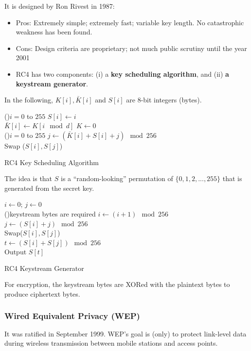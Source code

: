 \documentclass[12pt,titlepage]{article}
\begin{document}
It is designed by Ron Rivest in 1987: \begin{itemize}
\item Pros: Extremely simple; extremely fast; variable key length. No catastrophic weakness has been found.
\item Cons: Design criteria are proprietary; not much public scrutiny until the year 2001
\item RC4 has two components: (i) a \textbf{key scheduling algorithm}, and (ii) \textbf{a keystream generator}.
\end{itemize}

In the following, $K[i], \bar{K}[i]$ and $S[i]$ are 8-bit integers (bytes).

\begin{algorithm}[H]
	\For(){$i = 0$ to $255$}{
		$S[i] \leftarrow i$\\
		$\bar{K}[i] \leftarrow K[i \mod d]$
	}
	$K \leftarrow 0$\\
	\For(){$i = 0$ to $255$}{
		$j \leftarrow (\bar{K}[i] + S[i] + j) \mod 256$\\
		Swap ($S[i], S[j]$)
	}
	\caption{RC4 Key Scheduling Algorithm}
\end{algorithm}
The idea is that $S$ is a ``random-looking'' permutation of $\{0, 1, 2,..., 255\}$ that is generated from the secret key.

\begin{algorithm}[H]
	$i \leftarrow 0$; $j \leftarrow 0$\\
	\While(){keystream bytes are required}{
		$i \leftarrow (i+1) \mod 256$\\
		$j \leftarrow (S[i] + j) \mod 256$\\
		Swap($S[i], S[j]$)\\
		$t \leftarrow (S[i] + S[j]) \mod 256$\\
		Output $S[t]$
	}
	\caption{RC4 Keystream Generator}
\end{algorithm}

For encryption, the keystream bytes are XORed with the plaintext bytes to produce ciphertext bytes.

\subsubsection{Wired Equivalent Privacy (WEP)}
It was ratified in September 1999. WEP’s goal is (only) to protect link-level data during wireless transmission between mobile stations and access points.
\end{document}

